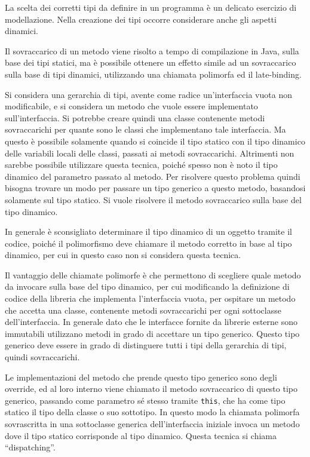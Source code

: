 \documentclass{article}
\numberwithin{equation}{subsection}
\begin{document}
La scelta dei corretti tipi da definire in un programma è un delicato esercizio di modellazione. Nella creazione dei tipi occorre considerare anche gli aspetti dinamici. 


Il sovraccarico di un metodo viene risolto a tempo di compilazione in Java, sulla base dei tipi statici, ma è possibile ottenere un effetto simile ad un sovraccarico sulla base 
di tipi dinamici, utilizzando una chiamata polimorfa ed il late-binding. 


Si considera una gerarchia di tipi, avente come radice un'interfaccia vuota non modificabile, e si considera un metodo che vuole essere implementato sull'interfaccia. 
Si potrebbe creare quindi una classe contenente metodi sovraccarichi per quante sono le classi che implementano tale interfaccia. Ma questo è possibile solamente quando si 
coincide il tipo statico con il tipo dinamico delle variabili locali delle classi, passati ai metodi sovraccarichi. Altrimenti non sarebbe possibile utilizzare questa tecnica, 
poiché spesso non è noto il tipo dinamico del parametro passato al metodo. 
Per risolvere questo problema quindi bisogna trovare un modo per passare un tipo generico a questo metodo, basandosi solamente sul tipo statico. Si vuole risolvere il metodo 
sovraccarico sulla base del tipo dinamico.  

In generale è sconsigliato determinare il tipo dinamico di un oggetto tramite il codice, poiché il polimorfismo deve chiamare il metodo corretto in base al tipo dinamico, per 
cui in questo caso non si considera questa tecnica. 

Il vantaggio delle chiamate polimorfe è che permettono di scegliere quale metodo da invocare sulla base del tipo dinamico, per cui modificando la definizione di codice della 
libreria che implementa l'interfaccia vuota, per ospitare un metodo che accetta una classe, contenente metodi sovraccarichi per ogni sottoclasse dell'interfaccia. In generale dato che 
le interfacce fornite da librerie esterne sono immutabili utilizzano metodi in grado di accettare un tipo generico. Questo tipo generico deve essere in grado di distinguere tutti i tipi 
della gerarchia di tipi, quindi sovraccarichi.  

Le implementazioni del metodo che prende questo tipo generico sono degli override, ed al loro interno viene chiamato il metodo sovraccarico di questo tipo generico, passando come parametro 
sé stesso tramite \verb|this|, che ha come tipo statico il tipo della classe o suo sottotipo. In questo modo la chiamata polimorfa sovrascritta in una sottoclasse generica dell'interfaccia 
iniziale invoca un metodo dove il tipo statico corrisponde al tipo dinamico. 
Questa tecnica si chiama ``dispatching''. 
\end{document}
